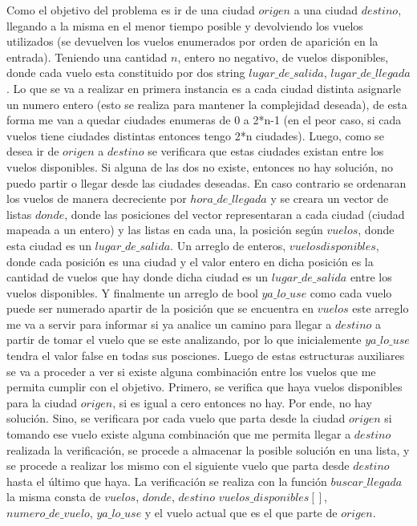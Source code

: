 \documentclass{article}
\begin{document}
Como el objetivo del problema es ir de una ciudad $origen$  a una ciudad $destino$,  llegando a la misma en el menor tiempo posible y devolviendo los vuelos utilizados (se devuelven los vuelos enumerados por orden de aparición en la entrada). Teniendo una cantidad $n$, entero no negativo, de vuelos disponibles, donde cada vuelo esta constituido por dos string $lugar\_de\_salida$, $lugar\_de\_llegada$. Lo que se va a realizar en primera instancia es a cada ciudad distinta asignarle un numero entero (esto se realiza para mantener la complejidad deseada),  de esta forma me van a quedar ciudades enumeras de 0 a 2*n-1 (en el peor caso, si cada vuelos tiene ciudades distintas entonces tengo 2*n ciudades). Luego, como se desea ir de $origen$ a $destino$ se verificara que estas ciudades existan entre los vuelos disponibles. Si alguna de las dos no existe, entonces no hay solución, no puedo partir o llegar desde las ciudades deseadas. En caso contrario se ordenaran los vuelos de manera decreciente por $hora\_de\_llegada$ y se creara un vector de listas $donde$, donde las posiciones del vector representaran a cada ciudad (ciudad mapeada a un entero) y las listas en cada una, la posición según $vuelos$, donde esta ciudad es un $lugar\_de\_salida$. Un arreglo de enteros, $vuelos disponibles$, donde cada posición es una ciudad y el valor entero en dicha posición es la cantidad de vuelos que hay donde dicha ciudad es un $lugar\_de\_salida$ entre los vuelos disponibles. Y finalmente un arreglo de bool $ya\_lo\_use$ como cada vuelo puede ser numerado apartir de la posición que se encuentra en $vuelos$ este arreglo me va a servir para informar si ya analice un camino para llegar a $destino$ a partir de tomar el vuelo que se este analizando, por lo que inicialemente $ya\_lo\_use$ tendra el valor false en todas sus posciones. Luego de estas estructuras auxiliares se va a proceder a ver si existe alguna combinación entre los vuelos que me permita cumplir con el objetivo. Primero, se verifica que haya vuelos disponibles para la ciudad $origen$, si es igual a cero entonces no hay. Por ende, no hay solución. Sino, se verificara por cada vuelo que parta desde la ciudad $origen$ si tomando ese vuelo existe alguna combinación que me permita llegar a $destino$ realizada la verificación, se procede  a almacenar la posible solución en una lista, y se procede a realizar los mismo con el siguiente vuelo que parta desde $destino$ hasta el último que haya. La verificación se realiza con la función  $buscar\_llegada$ la misma consta de $vuelos$, $donde$, $destino$ $vuelos\_disponibles[]$, $numero\_de\_vuelo$, $ya\_lo\_use$ y el vuelo actual que es el que parte de $origen$.
\end{document}

